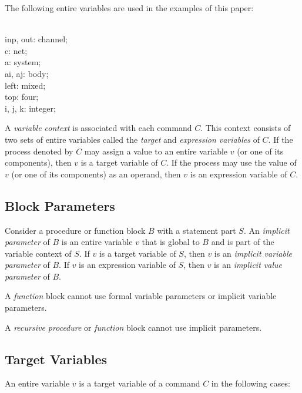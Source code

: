 \examples

\blankline

The following entire variables are used in the examples of
this paper:

\begin{program}{8.9em}
  {\PA}{\Var}              \\
    {\PB}inp, out: channel;\\
    {\PB}c: net;           \\
    {\PB}a: system;        \\
    {\PB}ai, aj: body;     \\
    {\PB}left: mixed;      \\
    {\PB}top: four;        \\
    {\PB}i, j, k: integer;
\end{program}

A {\it variable context} is associated with each command
$C$. This context consists of two sets of entire variables
called the {\it target} and {\it expression variables} of
$C$. If the process denoted by $C$ may assign a value to an
entire variable $v$ (or one of its components), then $v$ is
a target variable of $C$. If the process may use the value
of $v$ (or one of its components) as an operand, then $v$ is
an expression variable of $C$.


\subsection{Block Parameters}

Consider a procedure or function block $B$ with a statement
part $S$. An {\it implicit parameter} of $B$ is an entire
variable $v$ that is global to $B$ and is part of the
variable context of $S$. If $v$ is a target variable of $S$,
then $v$ is an {\it implicit variable parameter} of $B$. If
$v$ is an expression variable of $S$, then $v$ is an {\it
implicit value parameter} of $B$.

A {\it function} block cannot use formal variable parameters
or implicit variable parameters.

A {\it recursive procedure} or {\it function} block cannot
use implicit parameters.


\subsection{Target Variables}

An entire variable $v$ is a target variable of a command $C$
in the following cases:

